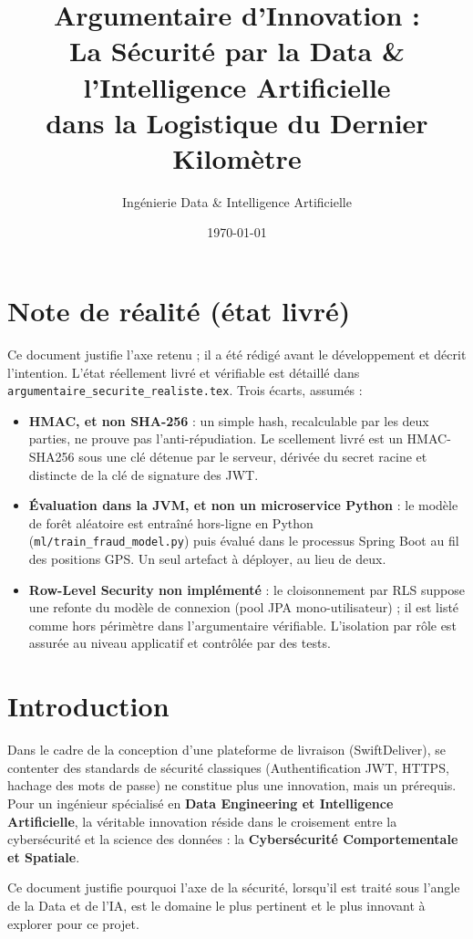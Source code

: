 \documentclass[11pt,a4paper]{article}
\title{\textbf{Argumentaire d'Innovation :\\ La Sécurité par la Data \& l'Intelligence Artificielle\\ dans la Logistique du Dernier Kilomètre}}
\author{Ingénierie Data \& Intelligence Artificielle}
\date{\today}
\begin{document}
\maketitle

\section*{Note de réalité (état livré)}

Ce document justifie l'axe retenu ; il a été rédigé avant le développement et
décrit l'intention. L'état réellement livré et vérifiable est détaillé dans
\texttt{argumentaire\_securite\_realiste.tex}. Trois écarts, assumés :

\begin{itemize}
    \item \textbf{HMAC, et non SHA-256} : un simple hash, recalculable par les
    deux parties, ne prouve pas l'anti-répudiation. Le scellement livré est un
    HMAC-SHA256 sous une clé détenue par le serveur, dérivée du secret racine et
    distincte de la clé de signature des JWT.
    \item \textbf{Évaluation dans la JVM, et non un microservice Python} : le
    modèle de forêt aléatoire est entraîné hors-ligne en Python
    (\texttt{ml/train\_fraud\_model.py}) puis évalué dans le processus Spring Boot
    au fil des positions GPS. Un seul artefact à déployer, au lieu de deux.
    \item \textbf{Row-Level Security non implémenté} : le cloisonnement par RLS
    suppose une refonte du modèle de connexion (pool JPA mono-utilisateur) ; il
    est listé comme hors périmètre dans l'argumentaire vérifiable. L'isolation
    par rôle est assurée au niveau applicatif et contrôlée par des tests.
\end{itemize}

\section*{Introduction}
Dans le cadre de la conception d'une plateforme de livraison (SwiftDeliver), se contenter des standards de sécurité classiques (Authentification JWT, HTTPS, hachage des mots de passe) ne constitue plus une innovation, mais un prérequis. Pour un ingénieur spécialisé en \textbf{Data Engineering et Intelligence Artificielle}, la véritable innovation réside dans le croisement entre la cybersécurité et la science des données : la \textbf{Cybersécurité Comportementale et Spatiale}. 

Ce document justifie pourquoi l'axe de la sécurité, lorsqu'il est traité sous l'angle de la Data et de l'IA, est le domaine le plus pertinent et le plus innovant à explorer pour ce projet.
\end{document}
